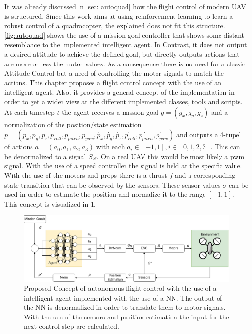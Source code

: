 It was already discussed in \cref{sec: autoquad} how the flight control of modern UAV is structured. Since this work aims at using reinforcement learning to learn a robust control of a quadrocopter, the explained does not fit this structure. 
\cref{fig:autoquad} shows the use of a mission goal controller that shows some distant resemblance to the implemented intelligent agent. In Contrast, it does not output a desired attitude to achieve the defined goal, but directly outputs actions that are more or less the motor values. As a consequence there is no need for a classic Attitude Control but a need of controlling the motor signals to match the actions.
This chapter proposes a flight control concept with the use of an intelligent agent. Also, it provides a general concept of the implementation in order to get a wider view at the different implemented classes, tools and scripts.\\
\newline
At each timestep $t$ the agent receives a mission goal $g=(g_x, g_y, g_z)$ and a normalization of the position/state estimation $p=(p_x, p_y, p_z, p_{roll}, p_{pitch}, p_{yaw}, \dot{p_x}, \dot{p_y}, \dot{p_z}, \dot{p_{roll}}, \dot{p_{pitch}}, \dot{p_{yaw}})$ and outputs a 4-tupel of actions $a = (a_0, a_1, a_2, a_3)$ with each $a_i \in [-1,1], i \in [0,1,2,3]$. This can be denormalized to a signal $S_N$. On a real UAV this would be most likely a pwm signal. With the use of a speed controller the signal is held at the specific value. With the use of the motors and props there is a thrust $f$ and a corresponding state transition that can be observed by the sensors. These sensor values $\sigma$ can be used in order to estimate the position and normalize it to the range $[-1,1]$. This concept is visualized in \cref{fig:conceptAuto}.

\begin{figure}[htp]
	\centering
	\includegraphics[width= 0.9 \linewidth]{figures/conceptAuto.png}
	\caption{Proposed Concept of autonomous flight control with the use of a intelligent agent implemented with the use of a NN. The output of the NN is denormalized in order to translate them to motor signals. With the use of the sensors and position estimation the input for the next control step are calculated.}
	\label{fig:conceptAuto}
\end{figure}

\newpage

